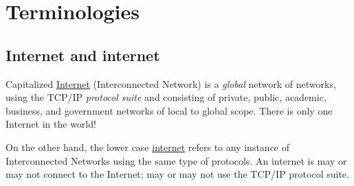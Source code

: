 \chapter{Terminologies}
\label{cha:ict-terminologies}

\section{Internet and internet}
\label{sec:internet-internet}

Capitalized \uline{Internet} (Interconnected Network) is a
\textit{global} network of networks, using the TCP/IP
\textit{protocol suite} and consisting of private, public,
academic, business, and government networks of local to global
scope. There is only one Internet in the world!

On the other hand, the lower case \uline{internet} refers to any
instance of Interconnected Networks using the same type of
protocols. An internet is may or may not connect to the Internet;
may or may not use the TCP/IP protocol suite.



